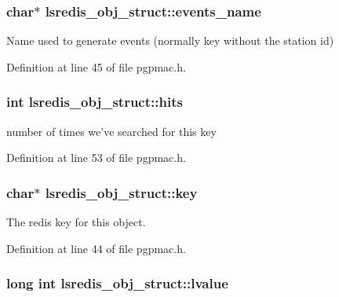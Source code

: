 \hypertarget{structlsredis__obj__struct_ad0a987a011b580eab739cda831f78fbb}{
\subsubsection[{events\-\_\-name}]{\setlength{\rightskip}{0pt plus 5cm}char$\ast$ lsredis\-\_\-obj\-\_\-struct\-::events\-\_\-name}}\label{structlsredis__obj__struct_ad0a987a011b580eab739cda831f78fbb}


Name used to generate events (normally key without the station id) 



Definition at line 45 of file pgpmac.\-h.

\hypertarget{structlsredis__obj__struct_a43fcbff584654ab086d973ce34cb6ddc}{
\subsubsection[{hits}]{\setlength{\rightskip}{0pt plus 5cm}int lsredis\-\_\-obj\-\_\-struct\-::hits}}\label{structlsredis__obj__struct_a43fcbff584654ab086d973ce34cb6ddc}


number of times we've searched for this key 



Definition at line 53 of file pgpmac.\-h.

\hypertarget{structlsredis__obj__struct_aa8c5a453b9424e5666320b8675a42f5c}{
\subsubsection[{key}]{\setlength{\rightskip}{0pt plus 5cm}char$\ast$ lsredis\-\_\-obj\-\_\-struct\-::key}}\label{structlsredis__obj__struct_aa8c5a453b9424e5666320b8675a42f5c}


The redis key for this object. 



Definition at line 44 of file pgpmac.\-h.

\hypertarget{structlsredis__obj__struct_a26211a0ab3fc02e7776e24dbc1f1256c}{
\subsubsection[{lvalue}]{\setlength{\rightskip}{0pt plus 5cm}long int lsredis\-\_\-obj\-\_\-struct\-::lvalue}}\label{structlsredis__obj__struct_a26211a0ab3fc02e7776e24dbc1f1256c}


